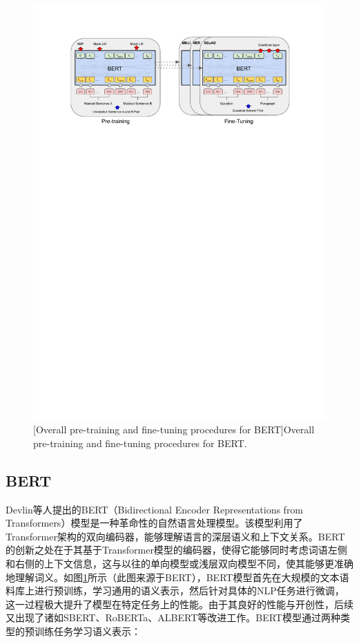\begin{figure}[h!]
\centering
{}
\includegraphics[width=1.0\columnwidth]{figures/RelatedWork/BERT.pdf}
[Overall pre-training and fine-tuning procedures for BERT]{Overall pre-training and fine-tuning procedures for BERT.}
\label{figure2: BERT}
\end{figure}

\subsection[\hspace{-2pt}BERT]{{\heiti{} \hspace{-8pt}BERT}}\label{section2: BERT}

Devlin等人\cite{Bert}提出的BERT（Bidirectional Encoder Representations from Transformers）模型是一种革命性的自然语言处理模型。该模型利用了Transformer架构的双向编码器，能够理解语言的深层语义和上下文关系。BERT的创新之处在于其基于Transformer模型的编码器，使得它能够同时考虑词语左侧和右侧的上下文信息，这与以往的单向模型或浅层双向模型不同，使其能够更准确地理解词义。如图\ref{figure2: BERT}所示（此图来源于BERT\cite{Bert}），BERT模型首先在大规模的文本语料库上进行预训练，学习通用的语义表示，然后针对具体的NLP任务进行微调，这一过程极大提升了模型在特定任务上的性能。由于其良好的性能与开创性，后续又出现了诸如SBERT\cite{SBERT}、RoBERTa\cite{RoBERTa}、ALBERT\cite{ALBERT}等改进工作。BERT模型通过两种类型的预训练任务学习语义表示：

